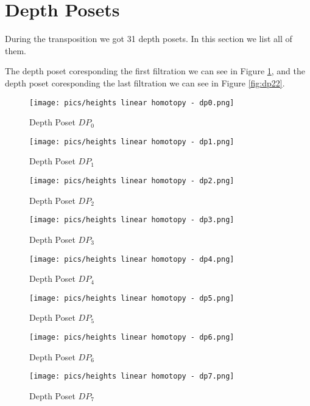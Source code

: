 \documentclass{article}
\begin{document}
\newpage


\section{Depth Posets}
\par During the transposition we got 31 depth posets. In this section we list all of them. 
\par The depth poset coresponding the first filtration we can see in Figure \ref{fig:dp0}, 
and the depth poset coresponding the last filtration we can see in Figure \ref{fig:dp22}.

\begin{figure}[h]
    \centering
    \texttt{[image: pics/heights linear homotopy - dp0.png]}
    \caption{Depth Poset $DP_{0}$}
    \label{fig:dp0}
\end{figure}
\begin{figure}[h]
    \centering
    \texttt{[image: pics/heights linear homotopy - dp1.png]}
    \caption{Depth Poset $DP_{1}$}
    \label{fig:dp1}
\end{figure}
\begin{figure}[h]
    \centering
    \texttt{[image: pics/heights linear homotopy - dp2.png]}
    \caption{Depth Poset $DP_{2}$}
    \label{fig:dp2}
\end{figure}
\begin{figure}[h]
    \centering
    \texttt{[image: pics/heights linear homotopy - dp3.png]}
    \caption{Depth Poset $DP_{3}$}
    \label{fig:dp3}
\end{figure}
\begin{figure}[h]
    \centering
    \texttt{[image: pics/heights linear homotopy - dp4.png]}
    \caption{Depth Poset $DP_{4}$}
    \label{fig:dp4}
\end{figure}
\begin{figure}[h]
    \centering
    \texttt{[image: pics/heights linear homotopy - dp5.png]}
    \caption{Depth Poset $DP_{5}$}
    \label{fig:dp5}
\end{figure}
\begin{figure}[h]
    \centering
    \texttt{[image: pics/heights linear homotopy - dp6.png]}
    \caption{Depth Poset $DP_{6}$}
    \label{fig:dp6}
\end{figure}
\begin{figure}[h]
    \centering
    \texttt{[image: pics/heights linear homotopy - dp7.png]}
    \caption{Depth Poset $DP_{7}$}
    \label{fig:dp7}
\end{figure}
\end{document}
